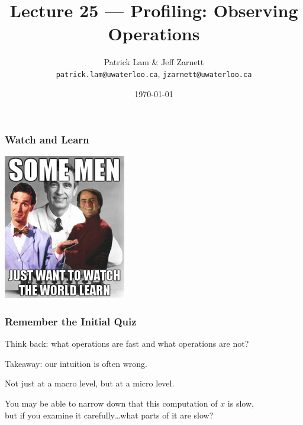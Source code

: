 


\title{Lecture 25 --- Profiling: Observing Operations }

\author{Patrick Lam \& Jeff Zarnett \\ \small \texttt{patrick.lam@uwaterloo.ca}, \texttt{jzarnett@uwaterloo.ca}}
\date{\today}




\begin{frame}
  \titlepage

 \end{frame}



\begin{frame}
\frametitle{Watch and Learn}

\begin{center}
	\includegraphics[width=0.4\textwidth]{images/watchandlearn.png}
\end{center}

\end{frame}

\begin{frame}
\frametitle{Remember the Initial Quiz}


Think back: what operations are fast and what operations are not?

Takeaway: our intuition  is often wrong. 

Not just at a macro level, but at a micro level. 

You may be able to narrow down that this computation of $x$ is slow, \\
but if you examine it carefully\ldots what parts of it are slow?


\end{frame}



